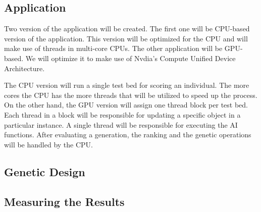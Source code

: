 \subsection{Application}
Two version of the application will be created. The first one will be CPU-based version of
the application. This version will be optimized for the CPU and will make use of threads
in multi-core CPUs. The other application will be GPU-based. We will optimize it to make use
of Nvdia's Compute Unified Device Architecture. 


The CPU version will run a single test bed for scoring an individual. The more cores the CPU has
the more threads that will be utilized to speed up the process. On the other hand, the GPU version
will assign one thread block per test bed. Each thread in a block will be responsible for 
updating a specific object in a particular instance. A single thread will be responsible
for executing the AI functions. After evaluating a generation, the ranking and the genetic 
operations will be handled by the CPU.

\subsection{Genetic Design}


\subsection{Measuring the Results}